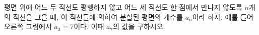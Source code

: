 \noindent\begin{minipage}[t]{0.58\linewidth}\vspace{0pt}\raggedright 평면 위에 어느 두 직선도 평행하지 않고 어느 세 직선도 한 점에서 만나지 않도록 $n$개의 직선을 그을 때, 이 직선들에 의하여 분할된 평면의 개수를 $a_n$이라 하자. 예를 들어 오른쪽 그림에서 $a_3=7$이다. 이때 $a_7$의 값을 구하시오.\end{minipage}\hfill\begin{minipage}[t]{0.4\linewidth}\vspace{0pt}\centering \resizebox{\ifdim\width>\linewidth\linewidth\else\width\fi}{!}{}\end{minipage}\par
